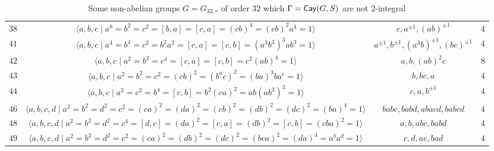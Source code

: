 \documentclass{amsart}
\def\Cay{{\sf Cay}} \def\Ker{{\sf Ker}}
\begin{document}
{\begin{table}
\begin{tabular}{|c|c|c|c|}
			$38$&$\langle a,b,c\mid a^8=b^2=c^2=[b,a]=[c,a]=(cb)^4=(cb)^2a^4=1\rangle$ &$ c, a^{\pm 1}, (ab)^{\pm 1}$&$4$\\
			$41$&$\langle a,b,c\mid a^4=b^4=c^2=b^2a^2=[c,a]=[c,b]=(a^{3}b^{3})^3ab^{3}=1\rangle$ &$  a^{\pm 1}, b^{\pm 1}, (a^3b)^{\pm 1}, (bc)^{\pm 1}$&$4$\\
			$42$&$\langle a,b,c\mid a^2=b^2=c^4=[c,a]=[c,b]=c^2(ab)^4=1\rangle$&$a, b, (ab)^2c $&$8$\\
			$43$&$\langle a,b,c\mid a^2=b^2=c^2=(cb)^2=(b^ac)^2=(ba)^3ba^c=1\rangle$ &$ b, bc, a $&$4$\\
			$44$&$\langle a,b,c\mid a^2=c^2=b^4=[c,b]=b^2(ca)^2=ab(ab^{3})^3=1\rangle$ &$c, a, b^{\pm 1}$&$4$\\
			$46$&$\langle a,b,c,d\mid a^2=b^2=d^2=c^2=(ca)^2=(da)^2=(cb)^2=(db)^2=(dc)^2=(ba)^4=1\rangle$ &$ babc, babd, abacd, babcd$&$4$\\
			$48$&$\langle a,b,c,d\mid  a^2=b^2=d^2=c^4=[d,c]=(da)^2=[c,a]=(db)^2=[c,b]=(cba)^2=1\rangle$ &$ a, b, abc, babd$&$4$\\
			$49$&$\langle a,b,c,d\mid a^2=b^2=d^2=c^2=(ca)^2=(db)^2=(dc)^2=(bca)^2=(da)^4=a^ba^d=1\rangle$&$c, d, ac, bad $&$4$\\	\hline			
		\end{tabular}
		\vspace{0.1cm}
		\caption{Some non-abelian groups $G=G_{32,r}$ of order $32$ which $\Gamma=\Cay(G,S)$ are not $2$-integral}\label{table:2}
		
	\end{table}
}
\end{document}
